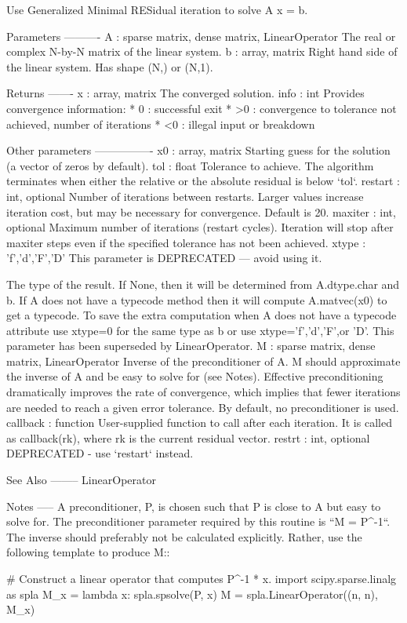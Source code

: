 \begin{DoxyVerb}Use Generalized Minimal RESidual iteration to solve A x = b.

Parameters
----------
A : {sparse matrix, dense matrix, LinearOperator}
    The real or complex N-by-N matrix of the linear system.
b : {array, matrix}
    Right hand side of the linear system. Has shape (N,) or (N,1).

Returns
-------
x : {array, matrix}
    The converged solution.
info : int
    Provides convergence information:
      * 0  : successful exit
      * >0 : convergence to tolerance not achieved, number of iterations
      * <0 : illegal input or breakdown

Other parameters
----------------
x0 : {array, matrix}
    Starting guess for the solution (a vector of zeros by default).
tol : float
    Tolerance to achieve. The algorithm terminates when either the relative
    or the absolute residual is below `tol`.
restart : int, optional
    Number of iterations between restarts. Larger values increase
    iteration cost, but may be necessary for convergence.
    Default is 20.
maxiter : int, optional
    Maximum number of iterations (restart cycles).  Iteration will stop
    after maxiter steps even if the specified tolerance has not been
    achieved.
xtype : {'f','d','F','D'}
    This parameter is DEPRECATED --- avoid using it.

    The type of the result.  If None, then it will be determined from
    A.dtype.char and b.  If A does not have a typecode method then it
    will compute A.matvec(x0) to get a typecode.   To save the extra
    computation when A does not have a typecode attribute use xtype=0
    for the same type as b or use xtype='f','d','F',or 'D'.
    This parameter has been superseded by LinearOperator.
M : {sparse matrix, dense matrix, LinearOperator}
    Inverse of the preconditioner of A.  M should approximate the
    inverse of A and be easy to solve for (see Notes).  Effective
    preconditioning dramatically improves the rate of convergence,
    which implies that fewer iterations are needed to reach a given
    error tolerance.  By default, no preconditioner is used.
callback : function
    User-supplied function to call after each iteration.  It is called
    as callback(rk), where rk is the current residual vector.
restrt : int, optional
    DEPRECATED - use `restart` instead.

See Also
--------
LinearOperator

Notes
-----
A preconditioner, P, is chosen such that P is close to A but easy to solve
for. The preconditioner parameter required by this routine is
``M = P^-1``. The inverse should preferably not be calculated
explicitly.  Rather, use the following template to produce M::

  # Construct a linear operator that computes P^-1 * x.
  import scipy.sparse.linalg as spla
  M_x = lambda x: spla.spsolve(P, x)
  M = spla.LinearOperator((n, n), M_x)\end{DoxyVerb}

